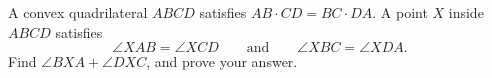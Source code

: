A convex quadrilateral $ABCD$ satisfies $AB\cdot CD=BC\cdot DA$. A point $X$ inside $ABCD$ satisfies
\[\angle XAB=\angle XCD\qquad\text{and}\qquad\angle XBC=\angle XDA.\]
Find $\angle BXA+\angle DXC$, and prove your answer.
